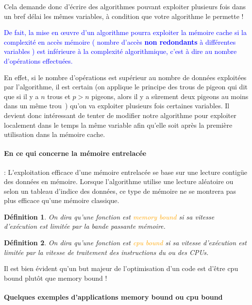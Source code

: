 \documentclass[fleqn,11pt]{article}
\newtheorem{definition}{Définition }
\begin{document}
Cela demande donc d'écrire des algorithmes pouvant exploiter plusieurs fois dans un bref délai les mêmes variables, à condition que votre algorithme le permette !

\textcolor{blue}{De fait, la mise en {\oe}uvre d'un algorithme pourra exploiter la mémoire cache si la complexité en accès mémoire ( nombre d'accès \textbf{non redondants} à différentes variables ) 
est inférieure à la complexité algorithmique, c'est à dire au nombre d'opérations effectuées.}

En effet, si le nombre d'opérations est supérieur au nombre de données exploitées par l'algorithme,
il est certain (on applique le principe des trous de pigeon qui dit que si il y a $n$ trous
et $p>n$ pigeons, alors il y a sûrement deux pigeons au moins dans un même trou~) qu'on va exploiter plusieurs
fois certaines variables. Il devient donc intéressant de tenter de modifier notre algorithme pour exploiter
localement dans le temps la même variable afin qu'elle soit après la première utilisation dans la
mémoire cache.

\paragraph{En ce qui concerne la mémoire entrelacée} : L'exploitation efficace d'une mémoire entrelacée se base sur une lecture contigüe des données en mémoire. Lorsque l'algorithme utilise une lecture aléatoire ou selon un tableau d'indice des données, ce type de mémoire ne se montrera pas plus efficace qu'une mémoire classique.


\begin{definition}
On dira qu'une fonction est \textcolor{orange}{memory bound} si sa vitesse d'exécution est limitée par la bande passante mémoire.
\end{definition}

\begin{definition}
On dira qu'une fonction est \textcolor{orange}{cpu bound} si sa vitesse d'exécution est limitée par la vitesse de traitement des instructions du ou des CPUs.
\end{definition}

Il est bien évident qu'un but majeur de l'optimisation d'un code est d'être cpu bound plutôt que memory bound !

\paragraph{Quelques exemples d'applications memory bound ou cpu bound}
{~} %
\end{document}
